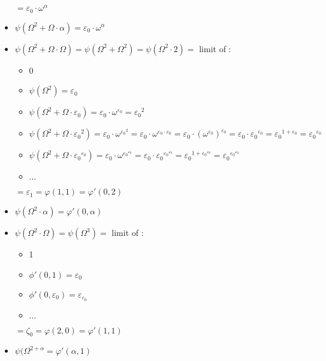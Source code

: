 \documentclass[10pt]{article}
\begin{document}
\begin{itemize}
\begin{itemize}
   \end{itemize}
   \( = \varepsilon_0 \cdot \omega^\alpha \)
\item \( \psi(\Omega^2+\Omega \cdot \alpha) = \varepsilon_0 \cdot \omega^\alpha \)
\item \( \psi(\Omega^2+\Omega \cdot \Omega) = \psi(\Omega^2+\Omega^2) = \psi(\Omega^2 \cdot 2) = \) limit of :
   \begin{itemize}
     \setlength{\itemsep}{1pt}
     \setlength{\parskip}{0pt}
     \setlength{\parsep}{0pt}
   \item  0
   \item \( \psi(\Omega^2) = \varepsilon_0 \)
   \item \( \psi(\Omega^2+\Omega \cdot \varepsilon_0) = \varepsilon_0 \cdot \omega^{\varepsilon_0} = {\varepsilon_0}^2 \)
   \item \( \psi(\Omega^2+\Omega \cdot {\varepsilon_0}^2) = \varepsilon_0 \cdot \omega ^{{\varepsilon_0}^2} = \varepsilon_0 \cdot \omega^{\varepsilon_0 \cdot \varepsilon_0} = \varepsilon_0 \cdot (\omega^{\varepsilon_0})^{\varepsilon_0} = \varepsilon_0 \cdot {\varepsilon_0}^{\varepsilon_0} = {\varepsilon_0}^{1+\varepsilon_0} = {\varepsilon_0}^{\varepsilon_0} \)
   \item \( \psi(\Omega^2+\Omega \cdot {\varepsilon_0}^{\varepsilon_0}) = \varepsilon_0 \cdot \omega^{{\varepsilon_0}^{\varepsilon_0}} = \varepsilon_0 \cdot {\varepsilon_0}^{{\varepsilon_0}^{\varepsilon_0}} = {\varepsilon_0}^{1+{\varepsilon_0}^{\varepsilon_0}} = {\varepsilon_0}^{{\varepsilon_0}^{\varepsilon_0}} \) 
   \item \( \ldots \)
   \end{itemize} 
   \( = \varepsilon_1 = \varphi(1,1) = \varphi'(0,2) \)
\item \( \psi(\Omega^2 \cdot \alpha) = \varphi'(0,\alpha) \)
\item \( \psi(\Omega^2 \cdot \Omega) = \psi(\Omega^3) = \) limit of : 
   \begin{itemize}
     \setlength{\itemsep}{1pt}
     \setlength{\parskip}{0pt}
     \setlength{\parsep}{0pt}
   \item  1
   \item \( \phi'(0,1) = \varepsilon_0 \)
   \item \( \phi'(0,\varepsilon_0) = \varepsilon_{\varepsilon_0} \)
   \item \( \ldots \)
   \end{itemize} 
   \( = \zeta_0 = \varphi(2,0) = \varphi'(1,1) \)
\item \( \psi(\Omega^{2+\alpha} = \varphi'(\alpha,1) \)

\end{itemize}
\end{document}

